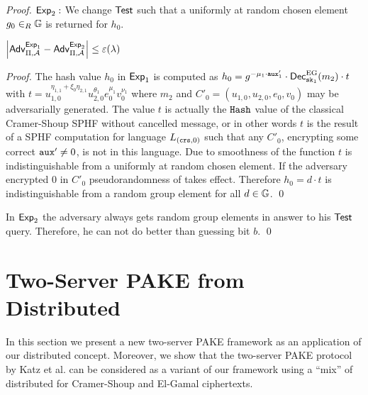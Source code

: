 \begin{proof}
\noindent$\mathsf{Exp}_2:$
We change $\mathsf{Test}$ such that a uniformly at random chosen element $g_0\in_R\mathbb{G}$ is returned for $h_0$.

\begin{claim}
$\left|\mathsf{Adv}_{\Pi,\mathcal{A}}^{\mathsf{Exp}_1}-\mathsf{Adv}_{\Pi,\mathcal{A}}^{\mathsf{Exp}_2}\right|\leq\varepsilon(\lambda)$
\end{claim}

\begin{proof}
The hash value $h_0$ in $\mathsf{Exp}_1$ is computed as $h_0=g^{-\mu_1\cdot\mathtt{aux}'_1}\cdot\mathsf{Dec}_{\mathtt{sk}_1}^{\mathrm{EG}}(m_2)\cdot t$ with $t=u_{1,0}^{\eta_{1,1}+\xi_0\eta_{2,1}}u_{2,0}^{\theta_1}\allowbreak e_0^{\mu_1}v_0^{\nu_1}$ where $m_2$ and $C'_0=(u_{1,0}, u_{2,0},\allowbreak e_0, v_0)$ may be adversarially generated.
The value $t$ is actually the $\mathtt{Hash}$ value of the classical Cramer-Shoup SPHF without cancelled message, or in other words $t$ is the result of a SPHF \Hash computation for language $L_{(\mathtt{crs},0)}$ such that any $C'_0$, encrypting some correct $\mathtt{aux}'\not=0$, is not in this language.
Due to smoothness of the \Hash function \cite{Benhamouda2013} $t$ is indistinguishable from a uniformly at random chosen element.
If the adversary encrypted $0$ in $C'_0$ pseudorandomness of \Hash takes effect.
Therefore $h_0=d\cdot t$ is indistinguishable from a random group element for all $d\in\mathbb{G}$.
\qed
\end{proof}

\noindent
In $\mathsf{Exp}_2$ the adversary always gets random group elements in answer to his $\mathsf{Test}$ query.
Therefore, he can not do better than guessing bit $b$.
\qed
\end{proof}

\section[Two-Server PAKE from Distributed SPHFx]{Two-Server PAKE from Distributed \SPHFF}\label{sec:twoserverpake}
In this section we present a new two-server PAKE framework as an application of our distributed \SPHFF concept.
Moreover, we show that the two-server PAKE protocol by Katz et al. \cite{Katz_MacKenzie_Taban_Gligor_2005} can be considered as a variant of our framework using a ``mix'' of distributed \SPHFF for Cramer-Shoup and El-Gamal ciphertexts.

